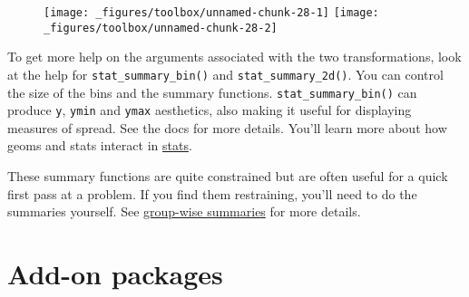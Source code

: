 \begin{Shaded}
\begin{Highlighting}[]
\StringTok{ }
\StringTok{  }\NormalTok{(} \NormalTok{, } \NormalTok{) +}\StringTok{ }
\StringTok{  }\NormalTok{(}\NormalTok{, }\NormalTok{) +}\StringTok{ }
\StringTok{  }\NormalTok{(}\NormalTok{, }\NormalTok{)}

 \StringTok{ }
\StringTok{  }\NormalTok{(} \NormalTok{, } \NormalTok{, } 
     \NormalTok{) +}\StringTok{ }
\StringTok{  }\NormalTok{(}\NormalTok{, }\NormalTok{) +}\StringTok{ }
\StringTok{  }\NormalTok{(}\NormalTok{, }\NormalTok{)}
\end{Highlighting}
\end{Shaded}

\begin{figure}[H]
  \texttt{[image: \_figures/toolbox/unnamed-chunk-28-1]}%
  \texttt{[image: \_figures/toolbox/unnamed-chunk-28-2]}
\end{figure}

To get more help on the arguments associated with the two
transformations, look at the help for \texttt{stat\_summary\_bin()} and
\texttt{stat\_summary\_2d()}. You can control the size of the bins and
the summary functions. \texttt{stat\_summary\_bin()} can produce
\texttt{y}, \texttt{ymin} and \texttt{ymax} aesthetics, also making it
useful for displaying measures of spread. See the docs for more details.
You'll learn more about how geoms and stats interact in
\protect\hyperlink{sec:stat}{stats}.

These summary functions are quite constrained but are often useful for a
quick first pass at a problem. If you find them restraining, you'll need
to do the summaries yourself. See
\protect\hyperlink{sec:summarise}{group-wise summaries} for more
details.

\hypertarget{sec:elsewhere}{\section{Add-on
packages}\label{sec:elsewhere}}


